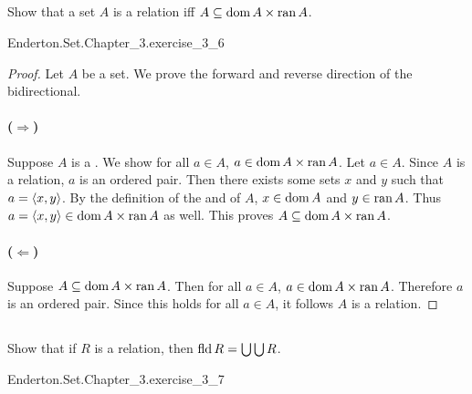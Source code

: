 \documentclass{report}
\begin{document}
\subsection{}%

  Show that a set $A$ is a relation iff $A \subseteq \mathop{\text{dom}}{A} \times \mathop{\text{ran}}{A}$.

    {Enderton.Set.Chapter\_3.exercise\_3\_6}

  \begin{proof}
    Let $A$ be a set.
    We prove the forward and reverse direction of the bidirectional.

    \paragraph{($\Rightarrow$)}%

      Suppose $A$ is a .
      We show for all $a \in A$, $a \in \mathop{\text{dom}}{A} \times \mathop{\text{ran}}{A}$.
      Let $a \in A$.
      Since $A$ is a relation, $a$ is an ordered pair.
      Then there exists some sets $x$ and $y$ such that $a = \left< x, y \right>$.
      By the definition of the  and  of
        $A$, $x \in \mathop{\text{dom}}{A}$ and $y \in \mathop{\text{ran}}{A}$.
      Thus $a = \left< x, y \right> \in \mathop{\text{dom}}{A} \times \mathop{\text{ran}}{A}$ as well.
      This proves $A \subseteq \mathop{\text{dom}}{A} \times \mathop{\text{ran}}{A}$.

    \paragraph{($\Leftarrow$)}%

      Suppose $A \subseteq \mathop{\text{dom}}{A} \times \mathop{\text{ran}}{A}$.
      Then for all $a \in A$, $a \in \mathop{\text{dom}}{A} \times \mathop{\text{ran}}{A}$.
      Therefore $a$ is an ordered pair.
      Since this holds for all $a \in A$, it follows $A$ is a relation.

  \end{proof}

\subsection{}%

  Show that if $R$ is a relation, then $\mathop{\text{fld}}{R} = \bigcup\bigcup R$.

    {Enderton.Set.Chapter\_3.exercise\_3\_7}
\end{document}
